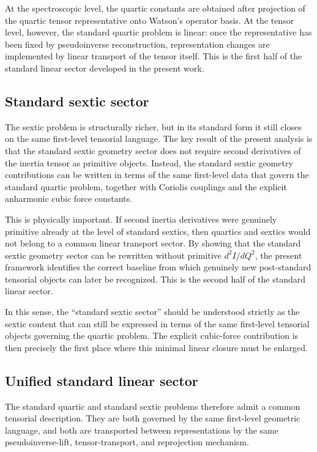 \documentclass[journal=jacsat,manuscript=article]{achemso}
\begin{document}
At the spectroscopic level, the quartic constants are obtained after
projection of the quartic tensor representative onto Watson's operator
basis. At the tensor level, however, the standard quartic problem is
linear: once the representative has been fixed by pseudoinverse
reconstruction, representation changes are implemented by linear
transport of the tensor itself. This is the first half of the
standard linear sector developed in the present work.

\subsection{Standard sextic sector}

The sextic problem is structurally richer, but in its standard form it
still closes on the same first-level tensorial language. The key
result of the present analysis is that the standard sextic geometry
sector does not require second derivatives of the inertia tensor as
primitive objects. Instead, the standard sextic geometry contributions
can be written in terms of the same first-level data that govern the
standard quartic problem, together with Coriolis couplings and the
explicit anharmonic cubic force constants.

This is physically important. If second inertia derivatives were
genuinely primitive already at the level of standard sextics, then
quartics and sextics would not belong to a common linear transport
sector. By showing that the standard sextic geometry sector can be
rewritten without primitive $d^2I/dQ^2$, the present framework
identifies the correct baseline from which genuinely new
post-standard tensorial objects can later be recognized. This is the
second half of the standard linear sector.

In this sense, the ``standard sextic sector'' should be understood
strictly as the sextic content that can still be expressed in terms of
the same first-level tensorial objects governing the quartic problem.
The explicit cubic-force contribution is then precisely the first place
where this minimal linear closure must be enlarged.

\subsection{Unified standard linear sector}

The standard quartic and standard sextic problems therefore admit a
common tensorial description. They are both governed by the same
first-level geometric language, and both are transported between
representations by the same pseudoinverse-lift, tensor-transport, and
reprojection mechanism.
\end{document}
